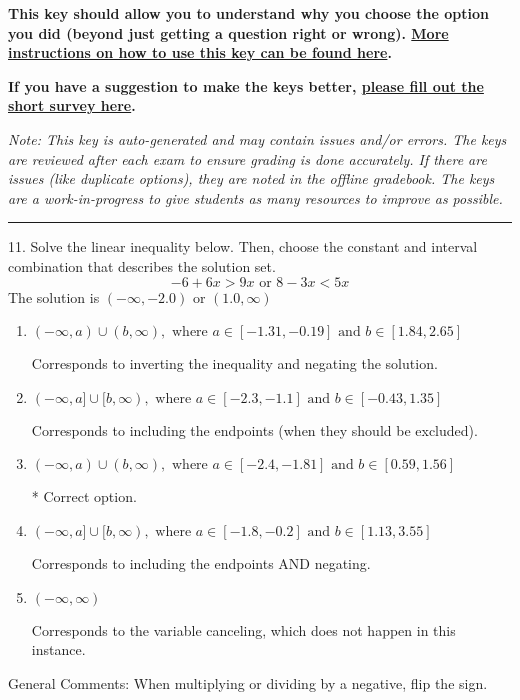 \documentclass{extbook}[14pt]
\begin{document}
\textbf{This key should allow you to understand why you choose the option you did (beyond just getting a question right or wrong). \href{https://xronos.clas.ufl.edu/mac1105spring2020/courseDescriptionAndMisc/Exams/LearningFromResults}{More instructions on how to use this key can be found here}.}

\textbf{If you have a suggestion to make the keys better, \href{https://forms.gle/CZkbZmPbC9XALEE88}{please fill out the short survey here}.}

\textit{Note: This key is auto-generated and may contain issues and/or errors. The keys are reviewed after each exam to ensure grading is done accurately. If there are issues (like duplicate options), they are noted in the offline gradebook. The keys are a work-in-progress to give students as many resources to improve as possible.}

\rule{\textwidth}{0.4pt}

11. Solve the linear inequality below. Then, choose the constant and interval combination that describes the solution set.
\[ -6 + 6 x > 9 x \text{ or } 8 - 3 x < 5 x \] 
The solution is $ (-\infty, -2.0) \text{ or } (1.0, \infty) $ 

\begin{enumerate}[label=\Alph*.] 
\item $ (-\infty, a) \cup (b, \infty), \text{ where } a \in [-1.31, -0.19] \text{ and } b \in [1.84, 2.65] $ 

 Corresponds to inverting the inequality and negating the solution. 
\item $ (-\infty, a] \cup [b, \infty), \text{ where } a \in [-2.3, -1.1] \text{ and } b \in [-0.43, 1.35] $ 

 Corresponds to including the endpoints (when they should be excluded). 
\item $ (-\infty, a) \cup (b, \infty), \text{ where } a \in [-2.4, -1.81] \text{ and } b \in [0.59, 1.56] $ 

  * Correct option. 
\item $ (-\infty, a] \cup [b, \infty), \text{ where } a \in [-1.8, -0.2] \text{ and } b \in [1.13, 3.55] $ 

 Corresponds to including the endpoints AND negating. 
\item $ (-\infty, \infty) $ 

 Corresponds to the variable canceling, which does not happen in this instance. 
\end{enumerate} 
 
General Comments: When multiplying or dividing by a negative, flip the sign.
\end{document}
